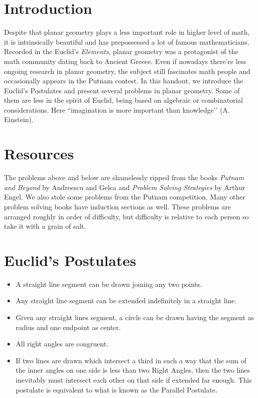\documentclass{article}
\theoremstyle{definition}
\theoremstyle{remark}
\begin{document}
\section{Introduction}
Despite that planar geometry plays a less important role in higher level of math, it is intrinsically beautiful and has prepossessed a lot of famous mathematicians. Recorded in the Euclid's \emph{Elements}, planar geometry was a protagonist of the math community dating back to Ancient Greece. Even if nowadays there're less ongoing research in planar geometry, the subject still fascinates math people and occasionally appears in the Putnam contest. In this handout, we introduce the Euclid's Postulates and present several problems in planar geometry. Some of them are less in the spirit of Euclid, being based on algebraic or combinatorial considerations. Here “imagination is more important than knowledge’’ (A. Einstein).

\section{Resources}
The problems above and below are shamelessly ripped from the books \textit{Putnam and Beyond} by Andreescu and Gelca and \textit{Problem Solving Strategies} by Arthur Engel. We also stole some problems from the Putnam competition. Many other problem solving books have induction sections as well. These problems are arranged roughly in order of difficulty, but difficulty is relative to each person so take it with a grain of salt.

\section{Euclid's Postulates} 
\begin{itemize}
    \item A straight line segment can be drawn joining any two points.
    \item Any straight line segment can be extended indefinitely in a straight line.
    \item Given any straight lines segment, a circle can be drawn having the segment as radius and one endpoint as center.
    \item All right angles are congruent.
    \item If two lines are drawn which intersect a third in such a way that the sum of the inner angles on one side is less than two Right Angles, then the two lines inevitably must intersect each other on that side if extended far enough. This postulate is equivalent to what is known as the Parallel Postulate.
\end{itemize}
\end{document}
